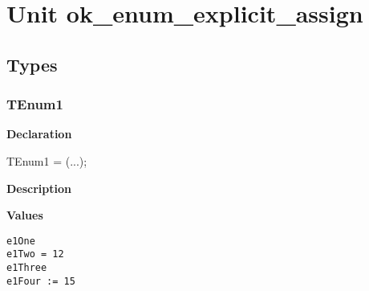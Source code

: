 \documentclass{report}
\begin{document}
\newlength{\tmplength}
\chapter{Unit ok{\_}enum{\_}explicit{\_}assign}
\section{Types}
\subsection*{TEnum1}
\begin{list}{}{
\setlength{\itemindent}{0cm}
\setlength{\listparindent}{0cm}
\setlength{\leftmargin}{\evensidemargin}
\addtolength{\leftmargin}{\tmplength}
\settowidth{\labelsep}{X}
\addtolength{\leftmargin}{\labelsep}
\setlength{\labelwidth}{\tmplength}
}
\begin{flushleft}
\item[\textbf{Declaration}\hfill]
\begin{ttfamily}
TEnum1 = (...);\end{ttfamily}


\end{flushleft}
\par
\item[\textbf{Description}]
 \item[\textbf{Values}]
\begin{description}
\item[\texttt{e1One}]  
\item[\texttt{e1Two = 12}]  
\item[\texttt{e1Three}]  
\item[\texttt{e1Four := 15}]  
\end{description}


\end{list}
\end{document}

